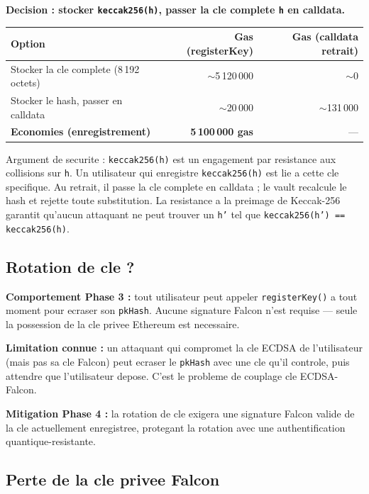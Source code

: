 \documentclass[11pt,a4paper]{article}
\begin{document}
\textbf{Decision : stocker \texttt{keccak256(h)}, passer la cle complete \texttt{h} en calldata.}

\begin{center}
\begin{tabular}{lrr}
\toprule
\textbf{Option} & \textbf{Gas (registerKey)} & \textbf{Gas (calldata retrait)} \\
\midrule
Stocker la cle complete (8\,192 octets) & $\sim$5\,120\,000 & $\sim$0 \\
Stocker le hash, passer en calldata & $\sim$20\,000 & $\sim$131\,000 \\
\midrule
\textbf{Economies (enregistrement)} & \textbf{5\,100\,000 gas} & --- \\
\bottomrule
\end{tabular}
\end{center}

Argument de securite : \texttt{keccak256(h)} est un engagement par resistance aux collisions sur \texttt{h}.
Un utilisateur qui enregistre \texttt{keccak256(h)} est lie a cette cle specifique. Au retrait,
il passe la cle complete en calldata ; le vault recalcule le hash et rejette toute substitution.
La resistance a la preimage de Keccak-256 garantit qu'aucun attaquant ne peut trouver un
\texttt{h'} tel que \texttt{keccak256(h') == keccak256(h)}.

\subsection{Rotation de cle ?}

\textbf{Comportement Phase 3 :} tout utilisateur peut appeler \texttt{registerKey()} a tout moment pour
ecraser son \texttt{pkHash}. Aucune signature Falcon n'est requise --- seule la possession de la
cle privee Ethereum est necessaire.

\textbf{Limitation connue :} un attaquant qui compromet la cle ECDSA de l'utilisateur (mais pas sa
cle Falcon) peut ecraser le \texttt{pkHash} avec une cle qu'il controle, puis attendre que
l'utilisateur depose. C'est le probleme de couplage cle ECDSA-Falcon.

\textbf{Mitigation Phase 4 :} la rotation de cle exigera une signature Falcon valide de la cle
actuellement enregistree, protegant la rotation avec une authentification quantique-resistante.

\subsection{Perte de la cle privee Falcon}
\end{document}

